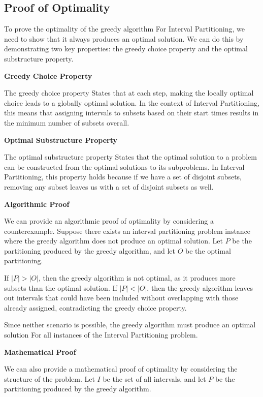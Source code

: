 \documentclass[12pt]{book} %
\begin{document}
\subsection{Proof of Optimality}

To prove the optimality of the greedy algorithm For Interval Partitioning, we need to show that it always produces an optimal solution. We can do this by demonstrating two key properties: the greedy choice property and the optimal substructure property.

\textbf{Greedy Choice Property}

The greedy choice property States that at each step, making the locally optimal choice leads to a globally optimal solution. In the context of Interval Partitioning, this means that assigning intervals to subsets based on their start times results in the minimum number of subsets overall.

\textbf{Optimal Substructure Property}

The optimal substructure property States that the optimal solution to a problem can be constructed from the optimal solutions to its subproblems. In Interval Partitioning, this property holds because if we have a set of disjoint subsets, removing any subset leaves us with a set of disjoint subsets as well.

\textbf{Algorithmic Proof}

We can provide an algorithmic proof of optimality by considering a counterexample. Suppose there exists an interval partitioning problem instance where the greedy algorithm does not produce an optimal solution. Let \( P \) be the partitioning produced by the greedy algorithm, and let \( O \) be the optimal partitioning.

If \( |P| > |O| \), then the greedy algorithm is not optimal, as it produces more subsets than the optimal solution. If \( |P| < |O| \), then the greedy algorithm leaves out intervals that could have been included without overlapping with those already assigned, contradicting the greedy choice property.

Since neither scenario is possible, the greedy algorithm must produce an optimal solution For all instances of the Interval Partitioning problem.

\textbf{Mathematical Proof}

We can also provide a mathematical proof of optimality by considering the structure of the problem. Let \( I \) be the set of all intervals, and let \( P \) be the partitioning produced by the greedy algorithm.
\end{document}
